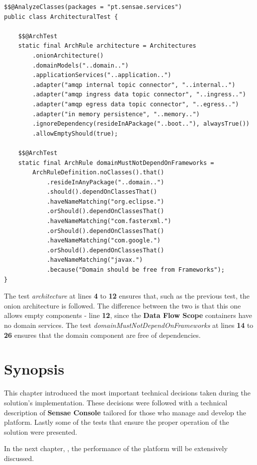 \begin{lstlisting}[style=Java, caption=Architectural Test - Simplified Onion Architecture - \textbf{Data Processor Flow}, label={code:implementation:tests:arch2}]
$$@AnalyzeClasses(packages = "pt.sensae.services")
public class ArchitecturalTest {

    $$@ArchTest
    static final ArchRule architecture = Architectures
        .onionArchitecture()
        .domainModels("..domain..")
        .applicationServices("..application..")
        .adapter("amqp internal topic connector", "..internal..")
        .adapter("amqp ingress data topic connector", "..ingress..")
        .adapter("amqp egress data topic connector", "..egress..")
        .adapter("in memory persistence", "..memory..")
        .ignoreDependency(resideInAPackage("..boot.."), alwaysTrue())
        .allowEmptyShould(true);

    $$@ArchTest
    static final ArchRule domainMustNotDependOnFrameworks =
        ArchRuleDefinition.noClasses().that()
            .resideInAnyPackage("..domain..")
            .should().dependOnClassesThat()
            .haveNameMatching("org.eclipse.")
            .orShould().dependOnClassesThat()
            .haveNameMatching("com.fasterxml.")
            .orShould().dependOnClassesThat()
            .haveNameMatching("com.google.")
            .orShould().dependOnClassesThat()
            .haveNameMatching("javax.")
            .because("Domain should be free from Frameworks");
}
\end{lstlisting}

The test \textit{architecture} at lines \textbf{4} to \textbf{12} ensures that, such as the previous test, the onion architecture is followed. The difference between the two is that this one allows empty components - line \textbf{12}, since the \textbf{Data Flow Scope} containers have no domain services. The test \textit{domainMustNotDependOnFrameworks} at lines \textbf{14} to \textbf{26} ensures that the domain component are free of dependencies.

\section{Synopsis}
\label{sec:implementation:synopsis}

This chapter introduced the most important technical decisions taken during the solution's implementation. These decisions were followed with a technical description of \textbf{Sensae Console} tailored for those who manage and develop the platform.
Lastly some of the tests that ensure the proper operation of the solution were presented.

In the next chapter, , the performance of the platform will be extensively discussed.
